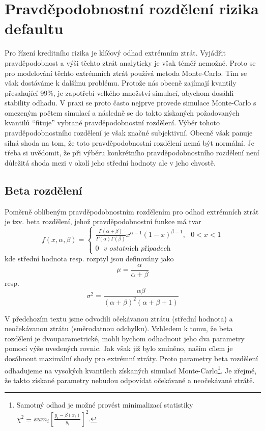 \chapter{Pravděpodobnostní rozdělení rizika defaultu}

Pro řízení kreditního rizika je klíčový odhad extrémním ztrát. Vyjádřit pravděpodobnost a výši těchto ztrát analyticky je však téměř nemožné. Proto se pro modelování těchto extrémních ztrát používá metoda Monte-Carlo. Tím se však dostáváme k dalšímu problému. Protože nás obecně zajímají kvantily přesahující 99\%, je zapotřebí velkého množství simulací, abychom dosáhli stability odhadu. V praxi se proto často nejprve provede simulace Monte-Carlo s omezeným počtem simulací a následně se do takto získaných požadovaných kvantilů ``fituje'' vybrané pravděpodobnostní rozdělení. Výběr tohoto pravděpodobnostního rozdělení je však značné subjektivní. Obecně však panuje silná shoda na tom, že toto pravděpodobnostní rozdělení nemá být normální. Je třeba si uvědomit, že při výběru konkrétního pravděpodobnostního rozdělení není důležitá shoda mezi v okolí jeho střední hodnoty ale v jeho chvostě.

\section{Beta rozdělení}

Poměrně oblíbeným pravděpodobnostním rozdělením pro odhad extrémních ztrát je tzv. beta rozdělení, jehož pravděpodobnostní funkce má tvar
\begin{equation}
f(x, \alpha, \beta) =
\begin{cases}
\frac{\Gamma(\alpha + \beta)}{\Gamma(\alpha)\Gamma(\beta)}x^{\alpha - 1}(1 - x)^{\beta - 1}, ~~~ 0 < x < 1\\
0 ~~~ \textit{v ostatních případech}
\end{cases}
\end{equation}
kde střední hodnota resp. rozptyl jsou definovány jako
\begin{equation}
\mu = \frac{\alpha}{\alpha + \beta}
\end{equation}
resp.
\begin{equation}
\sigma^2 = \frac{\alpha \beta}{(\alpha + \beta)^2(\alpha + \beta + 1)}
\end{equation}

V předchozím textu jsme odvodili očekávanou ztrátu (střední hodnota) a neočekávanou ztrátu (směrodatnou odchylku). Vzhledem k tomu, že beta rozdělení je dvouparametrické, mohli bychom odhadnout jeho dva parametry pomocí výše uvedených rovnic. Jak však již bylo zmíněno, naším cílem je dosáhnout maximální shody pro extrémní ztráty. Proto parametry beta rozdělení odhadujeme na vysokých kvantilech získaných simulací Monte-Carlo\footnote{Samotný odhad je možné provést minimalizací statistiky $\chi^2 \equiv sum_i \left[\frac{y_i - \beta(x_i)}{y_i}\right]^2$.}. Je zřejmé, že takto získané parametry nebudou odpovídat očekávané a neočekávané ztrátě.

